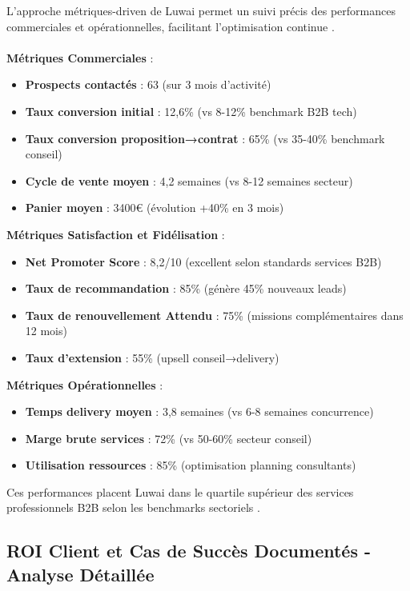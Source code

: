 L'approche métriques-driven de Luwai permet un suivi précis des performances commerciales et opérationnelles, facilitant l'optimisation continue \cite{luwai2025kpis}.
\\\\
\textbf{Métriques Commerciales } :
\begin{itemize}
    \item \textbf{Prospects contactés} : 63 (sur 3 mois d'activité)
    \item \textbf{Taux conversion initial} : 12,6\% (vs 8-12\% benchmark B2B tech)
    \item \textbf{Taux conversion proposition→contrat} : 65\% (vs 35-40\% benchmark conseil)
    \item \textbf{Cycle de vente moyen} : 4,2 semaines (vs 8-12 semaines secteur)
    \item \textbf{Panier moyen} : 3400€ (évolution +40\% en 3 mois)
\end{itemize}
\medskip
\textbf{Métriques Satisfaction et Fidélisation} :
\begin{itemize}
    \item \textbf{Net Promoter Score} : 8,2/10 (excellent selon standards services B2B)
    \item \textbf{Taux de recommandation} : 85\% (génère 45\% nouveaux leads)
    \item \textbf{Taux de renouvellement Attendu} : 75\% (missions complémentaires dans 12 mois)
    \item \textbf{Taux d'extension} : 55\% (upsell conseil→delivery)
\end{itemize}
\medskip
\textbf{Métriques Opérationnelles} :
\begin{itemize}
    \item \textbf{Temps delivery moyen} : 3,8 semaines (vs 6-8 semaines concurrence)
    \item \textbf{Marge brute services} : 72\% (vs 50-60\% secteur conseil)
    \item \textbf{Utilisation ressources} : 85\% (optimisation planning consultants)
\end{itemize}
\medskip
Ces performances placent Luwai dans le quartile supérieur des services professionnels B2B selon les benchmarks sectoriels \cite{professional_services2024benchmarks}.

\subsection{ROI Client et Cas de Succès Documentés - Analyse Détaillée}

